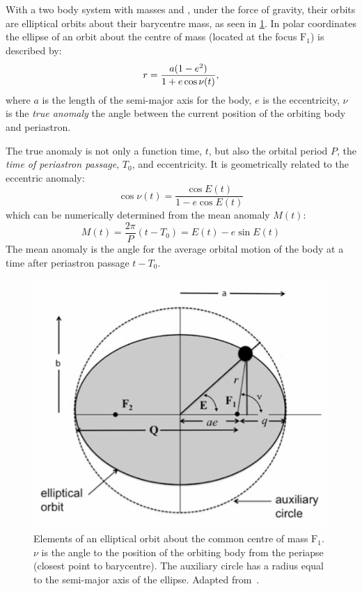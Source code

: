 With a two body system with masses \Mone{} and \Mtwo{}, under the force of gravity, their orbits are elliptical orbits about their barycentre mass, as seen in \cref{fig:eclipesorbit}.
In polar coordinates the ellipse of an orbit about the centre of mass (located at the focus $\textrm{F}_1$) is described by:
\begin{equation}
    r = \frac{a(1 - {e}^{2})}{1 + e \cos{\nu(t)}},
\end{equation}
where $a$ is the length of the semi-major axis for the body, $e$ is the eccentricity, $\nu$ is the \emph{true anomaly} the angle between the current position of the orbiting body and periastron.

The true anomaly is not only a function time, \(t\), but also the orbital period \(P\), the \emph{time of periastron passage}, \(T_0\), and eccentricity.
It is geometrically related to the eccentric anomaly:
\begin{equation}
    \cos{\nu(t)} = \frac{\cos{E(t)}}{1 - e \cos{E(t)}}
\end{equation}
which can be numerically determined from the mean anomaly \(M(t)\):
\begin{equation}
    M(t) = \frac{2 \pi}{P}(t - T_0) = E(t) - e \sin{E(t)}
\end{equation}
The mean anomaly is the angle for the average orbital motion of the body at a time after periastron passage \(t-T_0\).

\begin{figure}
    \centering
    \includegraphics[width=0.55\linewidth]{figures/fundamental_rv/eclipes_orbit2.pdf}
    \caption[Elements of an elliptical orbit.]{Elements of an elliptical orbit about the common centre of mass \(\textrm{F}_1\). {\(\nu\)} is the angle to the position of the orbiting body from the periapse (closest point to barycentre). The auxiliary circle has a radius equal to the semi-major axis of the ellipse. Adapted from~\citet{bozza_methods_2016}.}
    \label{fig:eclipesorbit}
\end{figure}

